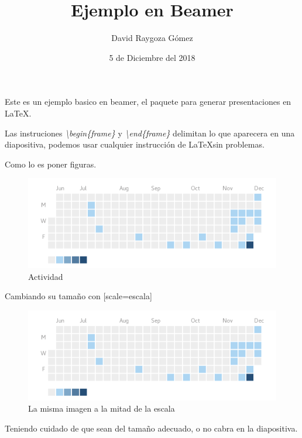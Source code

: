\documentclass{beamer}
\title{Ejemplo en Beamer}
\author{David Raygoza Gómez}
\date{5 de Diciembre del 2018}
\begin{document}
\begin{frame}
	\titlepage
\end{frame}

\begin{frame}
	Este es un ejemplo basico en beamer, el paquete para generar presentaciones en \LaTeX.
\end{frame}

\begin{frame}
	Las instruciones \emph{ \textbackslash begin\{frame\} } y \emph{\textbackslash  end\{frame\}} delimitan lo que aparecera en una diapositiva, podemos usar cualquier instrucción de \LaTeX sin problemas.
\end{frame}

\begin{frame}
	
	Como lo es poner figuras.
	
	\begin{figure}
		\includegraphics[scale=0.2]{imagenes/actividad.png}
		\caption{Actividad}
		\label{img_1}
	\end{figure}

	Cambiando su tamaño con [scale=escala]

	\begin{figure}
		\includegraphics[scale=0.1]{imagenes/actividad.png}
		\caption{La misma imagen a la mitad de la escala}
		\label{img_2}
	\end{figure}
	
	Teniendo cuidado de que sean del tamaño adecuado, o no cabra en la diapositiva.
	
\end{frame}
\end{document}

